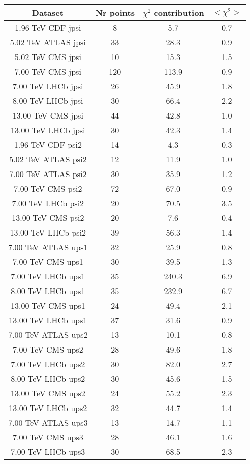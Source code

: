 \begin{table}[h!]
\centering
\begin{tabular}{c|c|c|c}
Dataset & Nr points & $\chi^2$ contribution & $<\chi^2>$ \\
\hline
1.96 TeV CDF jpsi & 8 & 5.7 & 0.7 \\
5.02 TeV ATLAS jpsi & 33 & 28.3 & 0.9 \\
5.02 TeV CMS jpsi & 10 & 15.3 & 1.5 \\
7.00 TeV CMS jpsi & 120 & 113.9 & 0.9 \\
7.00 TeV LHCb jpsi & 26 & 45.9 & 1.8 \\
8.00 TeV LHCb jpsi & 30 & 66.4 & 2.2 \\
13.00 TeV CMS jpsi & 44 & 42.8 & 1.0 \\
13.00 TeV LHCb jpsi & 30 & 42.3 & 1.4 \\
1.96 TeV CDF psi2 & 14 & 4.3 & 0.3 \\
5.02 TeV ATLAS psi2 & 12 & 11.9 & 1.0 \\
7.00 TeV ATLAS psi2 & 30 & 35.9 & 1.2 \\
7.00 TeV CMS psi2 & 72 & 67.0 & 0.9 \\
7.00 TeV LHCb psi2 & 20 & 70.5 & 3.5 \\
13.00 TeV CMS psi2 & 20 & 7.6 & 0.4 \\
13.00 TeV LHCb psi2 & 39 & 56.3 & 1.4 \\
7.00 TeV ATLAS ups1 & 32 & 25.9 & 0.8 \\
7.00 TeV CMS ups1 & 30 & 39.5 & 1.3 \\
7.00 TeV LHCb ups1 & 35 & 240.3 & 6.9 \\
8.00 TeV LHCb ups1 & 35 & 232.9 & 6.7 \\
13.00 TeV CMS ups1 & 24 & 49.4 & 2.1 \\
13.00 TeV LHCb ups1 & 37 & 31.6 & 0.9 \\
7.00 TeV ATLAS ups2 & 13 & 10.1 & 0.8 \\
7.00 TeV CMS ups2 & 28 & 49.6 & 1.8 \\
7.00 TeV LHCb ups2 & 30 & 82.0 & 2.7 \\
8.00 TeV LHCb ups2 & 30 & 45.6 & 1.5 \\
13.00 TeV CMS ups2 & 24 & 55.2 & 2.3 \\
13.00 TeV LHCb ups2 & 32 & 44.7 & 1.4 \\
7.00 TeV ATLAS ups3 & 13 & 14.7 & 1.1 \\
7.00 TeV CMS ups3 & 28 & 46.1 & 1.6 \\
7.00 TeV LHCb ups3 & 30 & 68.5 & 2.3 \\

\end{tabular}
\end{table}
